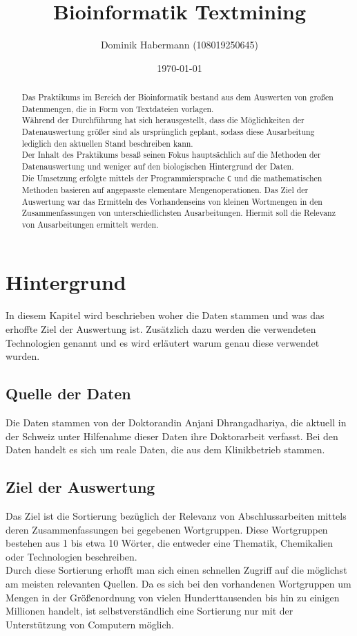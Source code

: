 \documentclass[a4paper,10pt]{article}
\title{Bioinformatik Textmining}
\author{Dominik Habermann (108019250645)}
\date{\today}
\newcommand{\dataSource}[0]{Anjani Dhrangadhariya}
\begin{document}
\maketitle

\begin{abstract}
    Das Praktikums im Bereich der Bioinformatik bestand aus dem Auswerten von großen Datenmengen, die in Form von Textdateien vorlagen.\\
    Während der Durchführung hat sich herausgestellt, dass die Möglichkeiten der Datenauswertung größer sind als ursprünglich geplant, sodass diese Ausarbeitung lediglich den aktuellen Stand beschreiben kann.\\
    Der Inhalt des Praktikums besaß seinen Fokus hauptsächlich auf die Methoden der Datenauswertung und weniger auf den biologischen Hintergrund der Daten.\\

    Die Umsetzung erfolgte mittels der Programmiersprache \texttt{C} und die mathematischen Methoden basieren auf angepasste elementare Mengenoperationen. Das Ziel der Auswertung war das Ermitteln des Vorhandenseins von kleinen Wortmengen in den Zusammenfassungen von unterschiedlichsten Ausarbeitungen. Hiermit soll die Relevanz von Ausarbeitungen ermittelt werden.
\end{abstract}

\section{Hintergrund}
    In diesem Kapitel wird beschrieben woher die Daten stammen und was das erhoffte Ziel der Auswertung ist. Zusätzlich dazu werden die verwendeten Technologien genannt und es wird erläutert warum genau diese verwendet wurden.
    \subsection{Quelle der Daten}
    Die Daten stammen von der Doktorandin \dataSource, die aktuell in der Schweiz unter Hilfenahme dieser Daten ihre Doktorarbeit verfasst. Bei den Daten handelt es sich um reale Daten, die aus dem Klinikbetrieb stammen.
    \subsection{Ziel der Auswertung}
    Das Ziel ist die Sortierung bezüglich der Relevanz von Abschlussarbeiten mittels deren Zusammenfassungen bei gegebenen Wortgruppen. Diese Wortgruppen bestehen aus 1 bis etwa 10 Wörter, die entweder eine Thematik, Chemikalien oder Technologien beschreiben.\\
    Durch diese Sortierung erhofft man sich einen schnellen Zugriff auf die möglichst am meisten relevanten Quellen. Da es sich bei den vorhandenen Wortgruppen um Mengen in der Größenordnung von vielen Hunderttausenden bis hin zu einigen Millionen handelt, ist selbstverständlich eine Sortierung nur mit der Unterstützung von Computern möglich.
\end{document}
